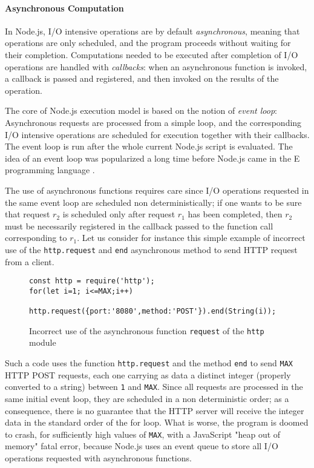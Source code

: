 \paragraph{Asynchronous Computation}
In Node.js, %
I/O intensive operations are by default \emph{asynchronous}, meaning that operations are only scheduled, and the program proceeds without waiting
for their completion.
Computations needed to be executed after completion of I/O operations are handled with \emph{callbacks}: when an asynchronous function is invoked, a callback is passed and registered, and then invoked on the results of the operation.

The core of Node.js execution model is based on the notion of \emph{event loop}: Asynchronous requests are processed from a simple loop,
and the corresponding I/O intensive operations are scheduled for execution together with their callbacks.
The event loop is run after the whole current Node.js script is evaluated.
The idea of an event loop was popularized a long time before Node.js came in the E programming language \cite{eventloop}.

The use of asynchronous functions requires care since I/O operations requested in the same event loop are scheduled non deterministically;
if one wants to be sure that request $r_2$ is scheduled only after request $r_1$ has been completed, then
$r_2$ must be necessarily registered in the callback passed to the function call corresponding to $r_1$.
Let us consider for instance this simple example of incorrect use of the \lstinline{http.request} and \lstinline{end} asynchronous method to send
HTTP request from a client.
\begin{figure}[h]
\begin{lstlisting}
const http = require('http');
for(let i=1; i<=MAX;i++)
    http.request({port:'8080',method:'POST'}).end(String(i));
\end{lstlisting}
\caption{Incorrect use of the asynchronous function \lstinline{request} of the \lstinline{http} module}
\label{lst:async}
\end{figure}
Such a code uses the function \lstinline{http.request} and the method \lstinline{end} to send  \lstinline{MAX} HTTP POST requests,
each one carrying as data a distinct integer (properly converted to a string)
between \lstinline{1} and \lstinline{MAX}. Since all requests are processed in the same initial event loop, they are
scheduled in a non deterministic order; as a consequence, there is no guarantee that the HTTP server will receive
the integer data in the standard order of the for loop. What is worse, the program is doomed to crash, for sufficiently high values of
\lstinline{MAX}, with a JavaScript "heap out of memory" fatal error, because Node.js uses an event queue to store all I/O operations
requested with asynchronous functions.

